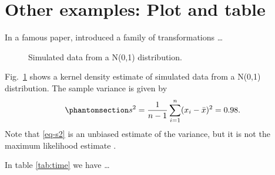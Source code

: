 \documentclass[
  journal,
]{IEEEtran}%
\begin{document}
\section{Other examples: Plot and
table}\label{other-examples-plot-and-table}

In a famous paper,  introduced a family of
transformations \dots

\begin{figure}[H]


\caption{\label{fig-density0}Simulated data from a N(0,1) distribution.}

\end{figure}%

Fig.~\ref{fig-density0} shows a kernel density estimate of simulated
data from a N(0,1) distribution. The sample variance is given by
\begin{equation}\phantomsection\label{eq-s2}{
  s^2 = \frac{1}{n-1} \sum_{i=1}^n (x_i-\bar{x})^2 = 0.98.
}\end{equation} Note that \ref{eq-s2} is an unbiased estimate of the
variance, but it is not the maximum likelihood estimate
.

In table \ref{tab:time} we have \ldots{}

\begin{table}[H]
\centering\centering
\caption{\label{tab:time}Test accuracy and processing time for each bootstrap-improved estimator. }
\end{table}
\end{document}
